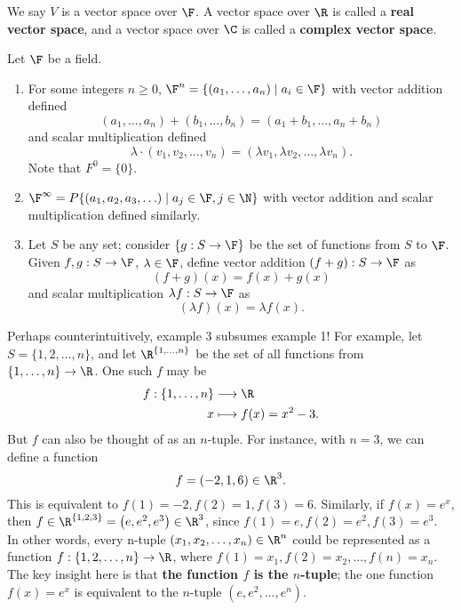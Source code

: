 \documentclass[math0540-lecture-notes.tex]{subfiles}
\begin{document}
\begin{example}
  We say $V$ is a vector space over $\F$. A vector space over $\R$ is called a \textbf{real vector
  space}, and a vector space over $\C$ is called a \textbf{complex vector space}.
\end{example}

\begin{example}
  Let $\F$ be a field.
  \begin{enumerate}
    \item For some integers $n\ge 0$, $\F^{n}=\{\left( a_1,\ldots,a_n \right) \mid a_i\in \F \} $
      with vector addition defined \[
        (a_1,\ldots,a_n)+(b_1,\ldots,b_n) = (a_1+b_1,\ldots,a_n+b_n)
      \] and scalar multiplication defined \[
      \lambda\cdot (v_1,v_2,\ldots,v_n) = (\lambda v_1,\lambda v_2,\ldots,\lambda v_n)
      .\] 
      Note that $ F^{0}=\{ 0 \}$.
    \item $\F^{\infty}=P\{ \left( a_1,a_2,a_3,\ldots \right)\mid a_j\in \F, j\in \N  \}$ with vector
      addition and scalar multiplication defined similarly.
    \item Let $S$ be any set; consider $\{ g:S\to\F \}$ be the set of functions from $S$ to $\F$.
      Given $f,g:S\to \F$, $\lambda\in \F$, define vector addition $(f+g):S\to\F$ as \[
        (f+g)(x) = f(x) + g(x)
      \] and scalar multiplication $ \lambda f:S\to\F$ as \[
      (\lambda f)(x) = \lambda f(x)
      .\] 
  \end{enumerate}
\end{example}
Perhaps counterintuitively, example 3 subsumes example 1! For example, let $S=\{1,2,\ldots,n\}$, and
let $\R^{\{ 1,\ldots,n \}}$ be the set of all functions from $\{ 1,\ldots,n \}\to \R$. One such $f$
may be \begin{align*}
  f: \{ 1,\ldots,n \} &\longrightarrow \R \\
  x &\longmapsto f(x) = x^2-3
.\end{align*} But $f$ can also be thought of as an $n$-tuple. For instance, with $n=3$, we can
define a function \[
  f = (-2,1,6)\in \R^3
.\] This is equivalent to $f(1)=-2,f(2)=1,f(3)=6$. Similarly, if $f(x) =e^{x}$, then $f\in \R^{\{
1,2,3 \}}=\left( e,e^2,e^3 \right) \in \R^3$, since $f(1)=e, f(2)=e^2,f(3)=e^3$. \\

In other words, every n-tuple $\left( x_1,x_2,\ldots,x_n \right) \in \R^n $ could be represented as a
function $f:\{ 1,2,\ldots,n \}\to\R$, where $f(1)=x_1,f(2)=x_2,\ldots,f(n)=x_n$. The key insight here is that
\textbf{the function $f$ is the $n$-tuple}; the one function $f(x)=e^{x}$ is equivalent to the
$n$-tuple $\left( e,e^2,\ldots,e^{n} \right) $.\\
\end{document}

